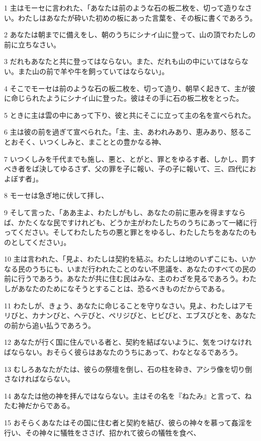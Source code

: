 \par 1 主はモーセに言われた、「あなたは前のような石の板二枚を、切って造りなさい。わたしはあなたが砕いた初めの板にあった言葉を、その板に書くであろう。
\par 2 あなたは朝までに備えをし、朝のうちにシナイ山に登って、山の頂でわたしの前に立ちなさい。
\par 3 だれもあなたと共に登ってはならない。また、だれも山の中にいてはならない。また山の前で羊や牛を飼っていてはならない」。
\par 4 そこでモーセは前のような石の板二枚を、切って造り、朝早く起きて、主が彼に命じられたようにシナイ山に登った。彼はその手に石の板二枚をとった。
\par 5 ときに主は雲の中にあって下り、彼と共にそこに立って主の名を宣べられた。
\par 6 主は彼の前を過ぎて宣べられた。「主、主、あわれみあり、恵みあり、怒ることおそく、いつくしみと、まこととの豊かなる神、
\par 7 いつくしみを千代までも施し、悪と、とがと、罪とをゆるす者、しかし、罰すべき者をば決してゆるさず、父の罪を子に報い、子の子に報いて、三、四代におよぼす者」。
\par 8 モーセは急ぎ地に伏して拝し、
\par 9 そして言った、「ああ主よ、わたしがもし、あなたの前に恵みを得ますならば、かたくなな民ですけれども、どうか主がわたしたちのうちにあって一緒に行ってください。そしてわたしたちの悪と罪とをゆるし、わたしたちをあなたのものとしてください」。
\par 10 主は言われた、「見よ、わたしは契約を結ぶ。わたしは地のいずこにも、いかなる民のうちにも、いまだ行われたことのない不思議を、あなたのすべての民の前に行うであろう。あなたが共に住む民はみな、主のわざを見るであろう。わたしがあなたのためになそうとすることは、恐るべきものだからである。
\par 11 わたしが、きょう、あなたに命じることを守りなさい。見よ、わたしはアモリびと、カナンびと、ヘテびと、ペリジびと、ヒビびと、エブスびとを、あなたの前から追い払うであろう。
\par 12 あなたが行く国に住んでいる者と、契約を結ばないように、気をつけなければならない。おそらく彼らはあなたのうちにあって、わなとなるであろう。
\par 13 むしろあなたがたは、彼らの祭壇を倒し、石の柱を砕き、アシラ像を切り倒さなければならない。
\par 14 あなたは他の神を拝んではならない。主はその名を『ねたみ』と言って、ねたむ神だからである。
\par 15 おそらくあなたはその国に住む者と契約を結び、彼らの神々を慕って姦淫を行い、その神々に犠牲をささげ、招かれて彼らの犠牲を食べ、
